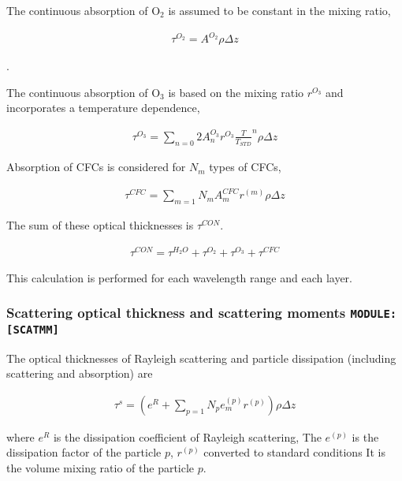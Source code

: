The continuous absorption of O\(_2\) is assumed to be constant in the
mixing ratio,

\begin{eqnarray}
\tau^{O_2} = A^{O_2} \rho \Delta z
\end{eqnarray}

.

The continuous absorption of O\(_3\) is based on the mixing ratio
\(r^{O_3}\) and incorporates a temperature dependence,

\begin{eqnarray}
\tau^{O_3} = \sum_{n=0}{2} A^{O_3}_n r^{O_3} \frac{T}{T_{STD}}^n \rho \Delta z
\end{eqnarray}

Absorption of CFCs is considered for \(N_m\) types of CFCs,

\begin{eqnarray}
\tau^{CFC} = \sum_{m=1}{N_m} A^{CFC}_m r^{(m)} \rho \Delta z
\end{eqnarray}

The sum of these optical thicknesses is \(\tau^{CON}\).

\begin{eqnarray}
 \tau^{CON} =  \tau^{H_2O} + \tau^{O_2} + \tau^{O_3} + \tau^{CFC} 
\end{eqnarray}

This calculation is performed for each wavelength range and each layer.

\hypertarget{scattering-optical-thickness-and-scattering-moments-modulescatmm}{%
\subsubsection{\texorpdfstring{Scattering optical thickness and
scattering moments
\texttt{MODULE:{[}SCATMM{]}}}{Scattering optical thickness and scattering moments MODULE:{[}SCATMM{]}}}\label{scattering-optical-thickness-and-scattering-moments-modulescatmm}}

The optical thicknesses of Rayleigh scattering and particle dissipation
(including scattering and absorption) are

\begin{eqnarray}
\tau^{s} 
 = \left( e^R + \sum_{p=1}{N_p} e^{(p)}_m r^{(p)}\right) \rho \Delta z
\end{eqnarray}

where \(e^R\) is the dissipation coefficient of Rayleigh scattering, The
\(e^{(p)}\) is the dissipation factor of the particle \(p\), \(r^{(p)}\)
converted to standard conditions It is the volume mixing ratio of the
particle \(p\).

